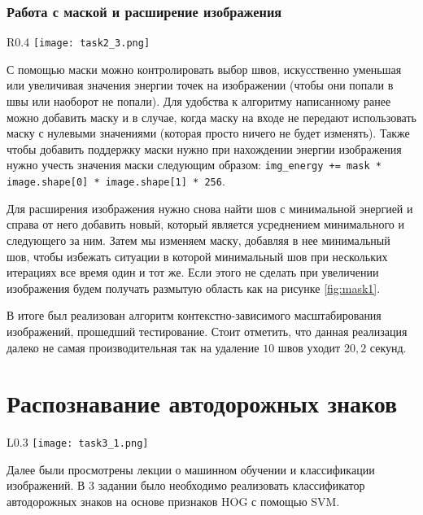 \documentclass[12pt]{article}
\begin{document}
\subsubsection*{Работа с маской и расширение изображения}

\begin{wrapfigure}{R}{0.4\textwidth}
  \texttt{[image: task2\_3.png]}
  \caption{\label{fig:mask1} Результат работы алгоритма с ошибкой}
\end{wrapfigure}

С помощью маски можно контролировать выбор швов, искусственно уменьшая или увеличивая значения энергии точек на изображении (чтобы они попали в швы или наоборот не попали). Для удобства к алгоритму написанному ранее можно добавить маску и в случае, когда маску на входе не передают использовать маску с нулевыми значениями (которая просто ничего не будет изменять). Также чтобы добавить поддержку маски нужно при нахождении энергии изображения нужно учесть значения маски следующим образом: \texttt{img\_energy += mask * image.shape[0] * image.shape[1] * 256}.

Для расширения изображения нужно снова найти шов с минимальной энергией и справа от него добавить новый, который является усреднением минимального и следующего за ним. Затем мы изменяем маску, добавляя в нее минимальный шов, чтобы избежать ситуации в которой минимальный шов при нескольких итерациях все время один и тот же. Если этого не сделать при увеличении изображения будем получать размытую область как на рисунке \ref{fig:mask1}.

В итоге был реализован алгоритм контекстно-зависимого масштабирования изображений, прошедший тестирование. Стоит отметить, что данная реализация далеко не самая производительная так на удаление $10$ швов уходит $20,2$ секунд.

\section*{Распознавание автодорожных знаков}
%

\begin{wrapfigure}{L}{0.3\textwidth}
  \texttt{[image: task3\_1.png]}
  \caption{График из лекции}
\end{wrapfigure}


Далее были просмотрены лекции о машинном обучении и классификации изображений. В 3 задании было необходимо реализовать классификатор автодорожных знаков на основе признаков HOG с помощью SVM.
\end{document}
